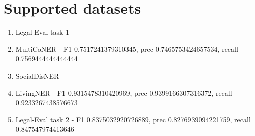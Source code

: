 \documentclass{article}
\begin{document}
\section{Supported datasets}
\begin{enumerate}
  \item Legal-Eval task 1
  \item MultiCoNER - F1 0.7517241379310345, prec 0.7465753424657534, recall 0.7569444444444444
  \item SocialDisNER - 
  \item LivingNER - F1 0.9315478310420969, prec 0.9399166307316372, recall 0.9233267438576673
  \item Legal-Eval task 2 - F1 0.8375032920726889, prec 0.8276939094221759, recall 0.847547974413646
\end{enumerate}
\end{document}
